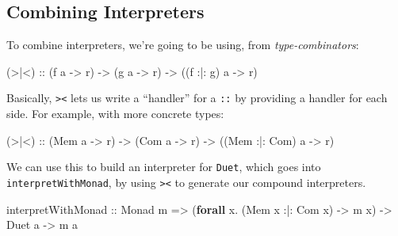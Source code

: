 \documentclass[]{article}
\newenvironment{Shaded}{}{}
\newcommand{\DataTypeTok}[1]{\textcolor[rgb]{0.56,0.13,0.00}{#1}}
\newcommand{\KeywordTok}[1]{\textcolor[rgb]{0.00,0.44,0.13}{\textbf{#1}}}
\newcommand{\NormalTok}[1]{#1}
\newcommand{\OperatorTok}[1]{\textcolor[rgb]{0.40,0.40,0.40}{#1}}
\newcommand{\OtherTok}[1]{\textcolor[rgb]{0.00,0.44,0.13}{#1}}
\begin{document}
\subsection{Combining Interpreters}\label{combining-interpreters}

To combine interpreters, we're going to be using, from \emph{type-combinators}:

\begin{Shaded}
\begin{Highlighting}[]
\OtherTok{(\textgreater{}|\textless{}) ::}\NormalTok{ (f a }\OtherTok{{-}\textgreater{}}\NormalTok{ r)}
      \OtherTok{{-}\textgreater{}}\NormalTok{ (g a }\OtherTok{{-}\textgreater{}}\NormalTok{ r)}
      \OtherTok{{-}\textgreater{}}\NormalTok{ ((f }\OperatorTok{:|:}\NormalTok{ g) a }\OtherTok{{-}\textgreater{}}\NormalTok{ r)}
\end{Highlighting}
\end{Shaded}

Basically, \texttt{\textgreater{}\textbar{}\textless{}} lets us write a
``handler'' for a \texttt{:\textbar{}:} by providing a handler for each side.
For example, with more concrete types:

\begin{Shaded}
\begin{Highlighting}[]
\OtherTok{(\textgreater{}|\textless{}) ::}\NormalTok{ (}\DataTypeTok{Mem}\NormalTok{ a           }\OtherTok{{-}\textgreater{}}\NormalTok{ r)}
      \OtherTok{{-}\textgreater{}}\NormalTok{ (}\DataTypeTok{Com}\NormalTok{ a           }\OtherTok{{-}\textgreater{}}\NormalTok{ r)}
      \OtherTok{{-}\textgreater{}}\NormalTok{ ((}\DataTypeTok{Mem} \OperatorTok{:|:} \DataTypeTok{Com}\NormalTok{) a }\OtherTok{{-}\textgreater{}}\NormalTok{ r)}
\end{Highlighting}
\end{Shaded}

We can use this to build an interpreter for \texttt{Duet}, which goes into
\texttt{interpretWithMonad}, by using
\texttt{\textgreater{}\textbar{}\textless{}} to generate our compound
interpreters.

\begin{Shaded}
\begin{Highlighting}[]
\NormalTok{interpretWithMonad}
\OtherTok{    ::} \DataTypeTok{Monad}\NormalTok{ m}
    \OtherTok{=\textgreater{}}\NormalTok{ (}\KeywordTok{forall}\NormalTok{ x}\OperatorTok{.}\NormalTok{ (}\DataTypeTok{Mem}\NormalTok{ x }\OperatorTok{:|:} \DataTypeTok{Com}\NormalTok{ x) }\OtherTok{{-}\textgreater{}}\NormalTok{ m x)}
    \OtherTok{{-}\textgreater{}} \DataTypeTok{Duet}\NormalTok{ a}
    \OtherTok{{-}\textgreater{}}\NormalTok{ m a}
\end{Highlighting}
\end{Shaded}
\end{document}
